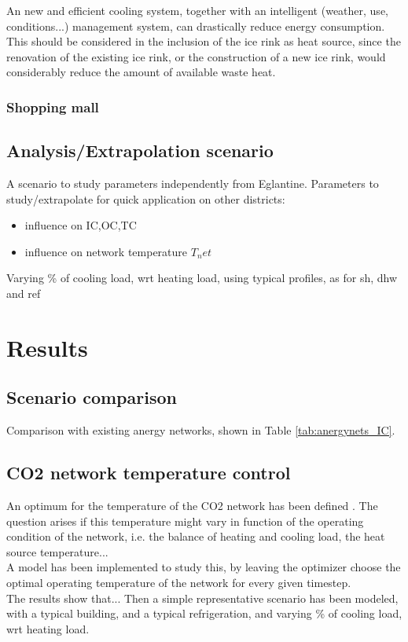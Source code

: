 \documentclass{article}
\begin{document}
An new and efficient cooling system, together with an intelligent (weather, use, conditions...) management system, can drastically reduce energy consumption. This should be considered in the inclusion of the ice rink as heat source, since the renovation of the existing ice rink, or the construction of a new ice rink, would considerably reduce the amount of available waste heat.

\subsubsection{Shopping mall}

\subsection{Analysis/Extrapolation scenario}
A scenario to study parameters independently from Eglantine.
Parameters to study/extrapolate for quick application on other districts:
\begin{itemize}
    \item influence on IC,OC,TC
    \item influence on network temperature $T_net$  
\end{itemize}
Varying \% of cooling load, wrt heating load, using typical profiles, as for sh, dhw and ref


\section{Results}

\subsection{Scenario comparison}
Comparison with existing anergy networks, shown in Table \ref{tab:anergynets_IC}.


\subsection{CO2 network temperature control}
An optimum for the temperature of the CO2 network has been defined .
The question arises if this temperature might vary in function of the operating condition of the network, i.e. the balance of heating and cooling load, the heat source temperature...\\
A model has been implemented to study this, by leaving the optimizer choose the optimal operating temperature of the network for every given timestep.\\
The results show that...
Then a simple representative scenario has been modeled, with a typical building, and a typical refrigeration, and varying \% of cooling load, wrt heating load.
\end{document}
